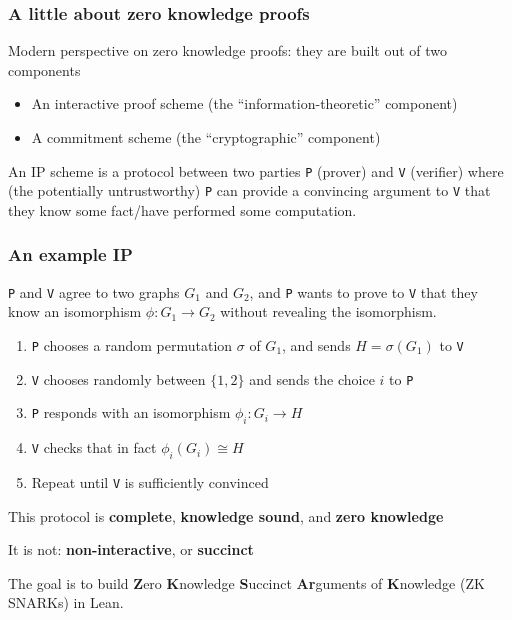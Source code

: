 \documentclass[options]{beamer}
\begin{document}
\begin{frame}[fragile]
    \frametitle{A little about zero knowledge proofs}

    Modern perspective on zero knowledge proofs: they are built out of two components
    \begin{itemize}
        \item An interactive proof scheme (the ``information-theoretic'' component)
        \item A commitment scheme (the ``cryptographic'' component)
    \end{itemize}

    An IP scheme is a protocol between two parties \verb+P+ (prover) and \verb+V+ (verifier)
    where (the potentially untrustworthy) \verb+P+ can provide a convincing argument to \verb+V+ that they know some fact/have performed some computation.

\end{frame}

\begin{frame}[fragile]
    \frametitle{An example IP}

    \verb+P+ and \verb+V+ agree to two graphs $G_1$ and $G_2$, and \verb+P+ wants to prove to \verb+V+ that they know an isomorphism $\phi : G_1 \to G_2$ without revealing the isomorphism.

    \begin{enumerate}
        \item \verb+P+ chooses a random permutation $\sigma$ of $G_1$, and sends $H = \sigma(G_1)$ to  \verb+V+
        \item \verb+V+ chooses randomly between $\{1, 2\}$ and sends the choice $i$ to \verb+P+
        \item \verb+P+ responds with an isomorphism $\phi_i : G_i \to H$
        \item \verb+V+ checks that in fact $\phi_i(G_i) \cong H$
        \item Repeat until \verb+V+ is sufficiently convinced
    \end{enumerate}

    This protocol is {\bf complete}, {\bf knowledge sound}, and {\bf zero knowledge}

    It is not: {\bf non-interactive}, or {\bf succinct}

    The goal is to build {\bf Z}ero {\bf K}nowledge {\bf S}uccinct {\bf Ar}guments of {\bf K}nowledge (ZK SNARKs) in Lean.
\end{frame}
\end{document}
